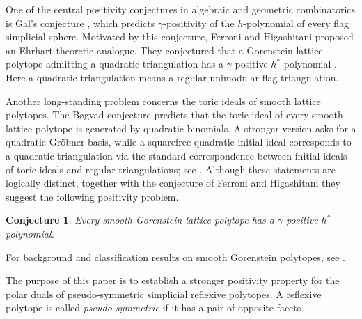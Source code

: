 \documentclass[10pt,a4paper]{amsart}
\newtheorem{Conjecture}[Theorem]{Conjecture}
\theoremstyle{definition}
\begin{document}
One of the central positivity conjectures in algebraic and geometric
combinatorics is Gal's conjecture \cite{Gal}, which predicts
$\gamma$-positivity of the $h$-polynomial of every flag simplicial sphere.
Motivated by this conjecture, Ferroni and Higashitani proposed an
Ehrhart-theoretic analogue.  They conjectured that a Gorenstein lattice
polytope admitting a quadratic triangulation has a $\gamma$-positive
$h^*$-polynomial
\cite[Conjecture~3.28]{FerroniHigashitani}.  Here a quadratic triangulation
means a regular unimodular flag triangulation.

Another long-standing problem concerns the toric ideals of smooth
lattice polytopes. The B{\o}gvad conjecture predicts that the toric ideal
of every smooth lattice polytope is generated by quadratic binomials.
A stronger version asks
for a quadratic Gr\"obner basis, while a squarefree quadratic initial ideal
corresponds to a quadratic triangulation via the standard correspondence
between initial ideals of toric ideals and regular triangulations; see
\cite[Chapter~8]{SturmfelsGBCP}.  Although these statements are logically
distinct, together with the conjecture of Ferroni and Higashitani they
suggest the following positivity problem.

\begin{Conjecture}\label{conj:smooth-gorenstein}
Every smooth Gorenstein lattice polytope has a $\gamma$-positive
$h^*$-polynomial.
\end{Conjecture}

For background and classification results on smooth Gorenstein polytopes,
see \cite{LorenzNill}.

The purpose of this paper is to establish a stronger positivity property
for the polar duals of pseudo-symmetric simplicial reflexive polytopes.
A reflexive polytope is called \emph{pseudo-symmetric} if it has a pair
of opposite facets.
\end{document}
